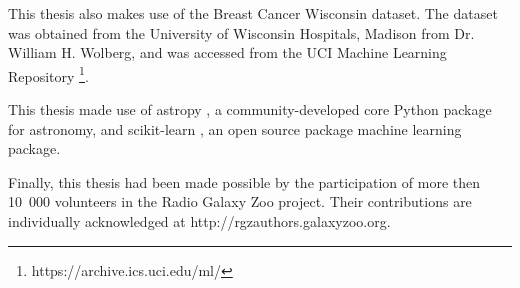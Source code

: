   This thesis also makes use of the Breast Cancer Wisconsin dataset. The dataset
  was obtained from the University of Wisconsin Hospitals, Madison from Dr.
  William H. Wolberg, and was accessed from the UCI Machine Learning Repository
  \footnote{https://archive.ics.uci.edu/ml/}.

  This thesis made use of astropy \citep{astropy}, a community-developed core
  Python package for astronomy, and scikit-learn \citep{scikit-learn}, an open
  source package machine learning package.

  Finally, this thesis had been made possible by the participation of more then
  10~000 volunteers in the Radio Galaxy Zoo project. Their contributions are
  individually acknowledged at http://rgzauthors.galaxyzoo.org.
